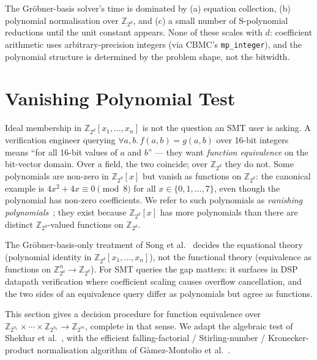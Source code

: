\documentclass[runningheads]{llncs}
\newcommand{\cbmc}{\textsc{CBMC}\xspace}
\begin{document}
The Gr\"obner-basis solver's time is dominated by (a) equation
collection, (b) polynomial normalisation over $\mathbb{Z}_{2^d}$,
and (c) a small number of S-polynomial reductions until the unit
constant appears. None of these scales with $d$: coefficient
arithmetic uses arbitrary-precision integers (via \cbmc's
\texttt{mp\_integer}), and the polynomial structure is determined
by the problem shape, not the bitwidth.


\section{Vanishing Polynomial Test}
\label{sec:vanishing}

Ideal membership in $\mathbb{Z}_{2^d}[x_1, \ldots, x_n]$ is not the
question an SMT user is asking. A verification engineer querying
$\forall a, b. \, f(a, b) = g(a, b)$ over 16-bit integers means
``for all 16-bit values of $a$ and $b$'' --- they want
\emph{function equivalence} on the bit-vector domain. Over a field,
the two coincide; over $\mathbb{Z}_{2^d}$ they do not. Some
polynomials are non-zero in $\mathbb{Z}_{2^d}[x]$ but vanish as
functions on $\mathbb{Z}_{2^d}$: the canonical example is
$4x^2 + 4x \equiv 0 \pmod{8}$ for all
$x \in \{0, 1, \ldots, 7\}$, even though the polynomial has
non-zero coefficients. We refer to such polynomials as
\emph{vanishing polynomials}~\cite{shekhar2007equivalence}; they
exist because $\mathbb{Z}_{2^d}[x]$ has more polynomials than
there are distinct $\mathbb{Z}_{2^d}$-valued functions on
$\mathbb{Z}_{2^d}$.

The Gr\"obner-basis-only treatment of
Song et al.~\cite{song2024equational} decides the equational
theory (polynomial identity in $\mathbb{Z}_{2^d}[x_1, \ldots,
x_n]$), not the functional theory (equivalence as functions on
$\mathbb{Z}_{2^d}^n \to \mathbb{Z}_{2^d}$). For SMT queries the
gap matters: it surfaces in DSP datapath verification where
coefficient scaling causes overflow cancellation, and the two
sides of an equivalence query differ as polynomials but agree as
functions.

This section gives a decision procedure for function equivalence
over $\mathbb{Z}_{2^{n_1}} \times \cdots \times
\mathbb{Z}_{2^{n_k}} \to \mathbb{Z}_{2^m}$, complete in that
sense. We adapt the algebraic test of
Shekhar et al.~\cite{shekhar2007equivalence}, with the efficient
falling-factorial / Stirling-number / Kronecker-product
normalisation algorithm of
G\`amez-Montolio et al.~\cite{gamez2024efficient}.
\end{document}
